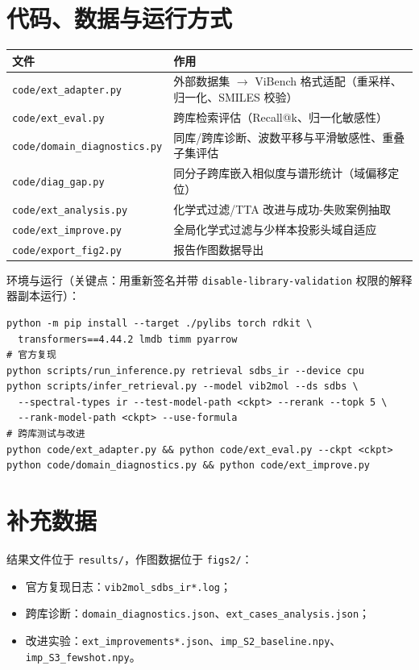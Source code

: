 \documentclass[UTF8,a4paper,11pt]{ctexart}
\begin{document}
\appendix
\section{代码、数据与运行方式}
\begin{table}[H]
\centering\footnotesize
\begin{tabular}{@{}ll@{}}
\toprule
文件 & 作用\\
\midrule
\texttt{code/ext\_adapter.py} & 外部数据集 $\to$ ViBench 格式适配（重采样、归一化、SMILES 校验）\\
\texttt{code/ext\_eval.py} & 跨库检索评估（Recall@k、归一化敏感性）\\
\texttt{code/domain\_diagnostics.py} & 同库/跨库诊断、波数平移与平滑敏感性、重叠子集评估\\
\texttt{code/diag\_gap.py} & 同分子跨库嵌入相似度与谱形统计（域偏移定位）\\
\texttt{code/ext\_analysis.py} & 化学式过滤/TTA 改进与成功-失败案例抽取\\
\texttt{code/ext\_improve.py} & 全局化学式过滤与少样本投影头域自适应\\
\texttt{code/export\_fig2.py} & 报告作图数据导出\\
\bottomrule
\end{tabular}
\end{table}

环境与运行（关键点：用重新签名并带 \texttt{disable-library-validation} 权限的解释器副本运行）：
\begin{verbatim}
python -m pip install --target ./pylibs torch rdkit \
  transformers==4.44.2 lmdb timm pyarrow
# 官方复现
python scripts/run_inference.py retrieval sdbs_ir --device cpu
python scripts/infer_retrieval.py --model vib2mol --ds sdbs \
  --spectral-types ir --test-model-path <ckpt> --rerank --topk 5 \
  --rank-model-path <ckpt> --use-formula
# 跨库测试与改进
python code/ext_adapter.py && python code/ext_eval.py --ckpt <ckpt>
python code/domain_diagnostics.py && python code/ext_improve.py
\end{verbatim}

\section{补充数据}
结果文件位于 \texttt{results/}，作图数据位于 \texttt{figs2/}：
\begin{itemize}[leftmargin=1.4em,itemsep=0pt]
\item 官方复现日志：\texttt{vib2mol\_sdbs\_ir*.log}；
\item 跨库诊断：\texttt{domain\_diagnostics.json}、\texttt{ext\_cases\_analysis.json}；
\item 改进实验：\texttt{ext\_improvements*.json}、\texttt{imp\_S2\_baseline.npy}、\texttt{imp\_S3\_fewshot.npy}。
\end{itemize}
\end{document}
